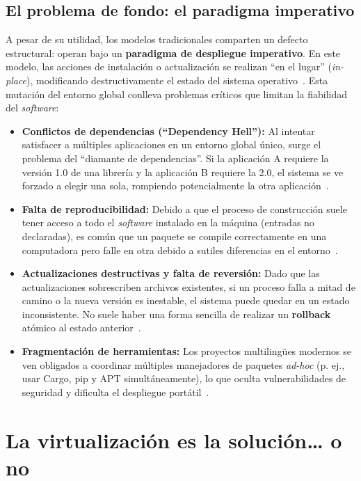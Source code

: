 \subsection{El problema de fondo: el paradigma imperativo}

A pesar de su utilidad, los modelos tradicionales comparten un defecto estructural: operan bajo un \textbf{paradigma de despliegue imperativo}. En este modelo, las acciones de instalación o actualización se realizan ``en el lugar'' (\emph{in-place}), modificando destructivamente el estado del sistema operativo~\cite{Courts2013}. Esta mutación del entorno global conlleva problemas críticos que limitan la fiabilidad del \emph{software}:

\begin{itemize}
\item \textbf{Conflictos de dependencias (``Dependency Hell''):} Al intentar satisfacer a múltiples aplicaciones en un entorno global único, surge el problema del ``diamante de dependencias''. Si la aplicación A requiere la versión 1.0 de una librería y la aplicación B requiere la 2.0, el sistema se ve forzado a elegir una sola, rompiendo potencialmente la otra aplicación~\cite{Zwinger2026}.
\item \textbf{Falta de reproducibilidad:} Debido a que el proceso de construcción suele tener acceso a todo el \emph{software} instalado en la máquina (entradas no declaradas), es común que un paquete se compile correctamente en una computadora pero falle en otra debido a sutiles diferencias en el entorno~\cite{Courts2013}.
\item \textbf{Actualizaciones destructivas y falta de reversión:} Dado que las actualizaciones sobrescriben archivos existentes, si un proceso falla a mitad de camino o la nueva versión es inestable, el sistema puede quedar en un estado inconsistente. No suele haber una forma sencilla de realizar un \textbf{rollback} atómico al estado anterior~\cite{Dolstra2006}.
\item \textbf{Fragmentación de herramientas:} Los proyectos multilingües modernos se ven obligados a coordinar múltiples manejadores de paquetes \emph{ad-hoc} (p. ej., usar Cargo, pip y APT simultáneamente), lo que oculta vulnerabilidades de seguridad y dificulta el despliegue portátil~\cite{Gibb2026}.
\end{itemize}

\section{La virtualización es la solución\dots{} o no}

